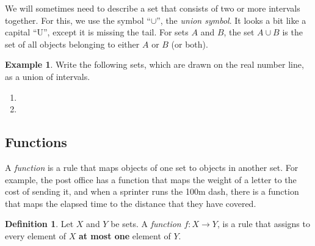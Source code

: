 \documentclass[letterpaper,12pt,oneside]{book}
\theoremstyle{definition}
\newtheorem{definition}[theorem]{Definition}
\newtheorem{example}[theorem]{Example}
\begin{document}
{\noindent
We will sometimes need to describe a set that consists of two or more intervals together.  For this, we use the symbol ``$\cup$'', the \emph{union symbol}.  It looks a bit like a capital ``U'', except it is missing the tail.  For sets $A$ and $B$, the set $A\cup B$ is the set of all objects belonging to either $A$ or $B$ (or both).

\begin{example}
Write the following sets, which are drawn on the real number line, as a union of intervals.
\begin{enumerate}
\item {}

\vfill

\item {}
\end{enumerate}
\end{example}

\newpage

\subsection*{Functions}

A \emph{function} is a rule that maps objects of one set to objects in another set.  For example, the post office has a function that maps the weight of a letter to the cost of sending it, and when a sprinter runs the 100m dash, there is a function that maps the elapsed time to the distance that they have covered.

\begin{definition}
Let $X$ and $Y$ be sets.  A \emph{function} $f:X\rightarrow Y$, is a rule that assigns to every element of $X$ \textbf{at most one} element of $Y$.
\end{definition}

}
\end{document}
